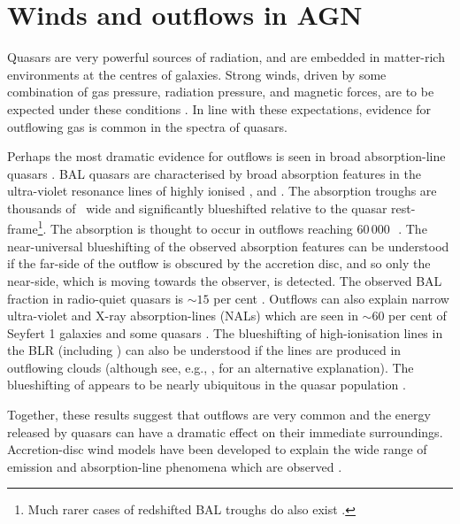 \section{Winds and outflows in AGN}
\label{sec:ch1-winds}

Quasars are very powerful sources of radiation, and are embedded in matter-rich environments at the centres of galaxies.
Strong winds, driven by some combination of gas pressure, radiation pressure, and magnetic forces, are to be expected under these conditions \citep[e.g.][]{blandford82b,proga00,everett05}. 
In line with these expectations, evidence for outflowing gas is common in the spectra of quasars. 

Perhaps the most dramatic evidence for outflows is seen in broad absorption-line quasars \citep[BAL quasars;][]{weymann91}.
BAL quasars are characterised by broad absorption features in the ultra-violet resonance lines of highly ionised ,  and . 
The absorption troughs are thousands of \kms\, wide and significantly blueshifted relative to the quasar rest-frame\footnote{Much rarer cases of redshifted BAL troughs do also exist \citep[e.g.][]{hall13}.}. 
The absorption is thought to occur in outflows reaching $60\,000$\,\kms\, \citep[e.g.][]{turnshek88}. 
The near-universal blueshifting of the observed absorption features can be understood if the far-side of the outflow is obscured by the accretion disc, and so only the near-side, which is moving towards the observer, is detected. 
The observed  BAL fraction in radio-quiet quasars is $\sim15$ per cent \citep[e.g.][]{hewett03,reichard03}.
Outflows can also explain narrow ultra-violet and X-ray absorption-lines (NALs) which are seen in $\sim60$ per cent of Seyfert 1 galaxies \citep{crenshaw99} and some quasars \citep[e.g.][]{hamann97}. 
The blueshifting of high-ionisation lines in the BLR (including ) can also be understood if the lines are produced in outflowing clouds (although see, e.g., \citealt{gaskell16}, for an alternative explanation). 
The blueshifting of  appears to be nearly ubiquitous in the quasar population \citep[e.g.][]{richards02,richards11}. 

Together, these results suggest that outflows are very common and the energy released by quasars can have a dramatic effect on their immediate surroundings. 
Accretion-disc wind models have been developed to explain the wide range of emission and absorption-line phenomena which are observed \citep[e.g.][]{murray95,elvis00,proga00,everett05}.
  

